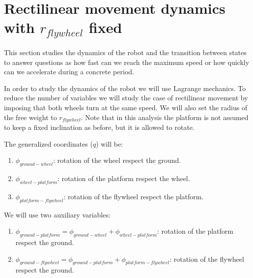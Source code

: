 \section{Rectilinear movement dynamics with $r_{flywheel}$ fixed}
This section studies the dynamics of the robot and the transition between states
to answer questions as how fast can we reach the maximum speed or how quickly can we
accelerate during a concrete period.

In order to study the dynamics of the robot we will use Lagrange mechanics.
To reduce the number of variables we will study the case of rectilinear
movement by imposing that both wheels turn at the same speed. We will also set
the radius of the free weight to $r_{flywheel}$. Note that in this analysis the
platform is not assumed to keep a fixed inclination as before, but it is allowed to rotate.

The generalized coordinates ($q$) will be:
\begin{enumerate}
	\item $\phi_{ground-wheel}$: rotation of the wheel respect the ground.
	\item $\phi_{wheel-platform}$: rotation of the platform respect the wheel.
	\item $\phi_{platform-flywheel}$: rotation of the flywheel respect the platform.
\end{enumerate}

We will use two auxiliary variables:
\begin{enumerate}
	\item $\phi_{ground-platform}=\phi_{ground-wheel}+\phi_{wheel-platform}$: rotation of the platform respect the ground.
	\item $\phi_{ground-flywheel}=\phi_{ground-platform}+\phi_{platform-flywheel}$: rotation of the flywheel respect the ground.
\end{enumerate}

